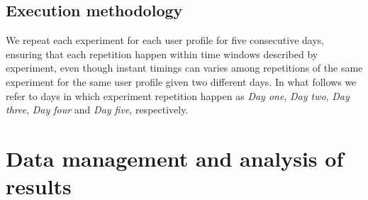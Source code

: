 \documentclass[10pt,a4paper]{article}
\begin{document}
    \subsection{Execution methodology}

    We repeat each experiment for each user profile for five
    consecutive days, ensuring that each repetition happen within time
    windows described by experiment, even though instant timings can
    varies among repetitions of the same experiment for the same user
    profile given two different days. In what follows we refer to days
    in which experiment repetition happen as \emph{Day one}, \emph{Day
      two}, \emph{Day three}, \emph{Day four} and \emph{Day five},
    respectively.

    \newpage
    \section{Data management and analysis of results}
    \label{sec:data-management-result-analysis}
    \lipsum[1]

    
\end{document}

